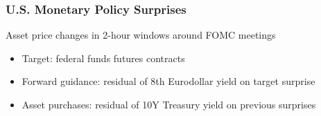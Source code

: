\documentclass[12pt, aspectratio=169, xcolor=dvipsnames]{beamer}
\begin{document}


{%
\begin{frame}
\frametitle{U.S. Monetary Policy Surprises}

Asset price changes in 2-hour windows around FOMC meetings %
	\begin{itemize}
		\item \alert{Target}: federal funds futures contracts
		\item \alert{Forward guidance}: residual of 8th Eurodollar yield on target surprise
		\item \alert{Asset purchases}: residual of 10Y Treasury yield on previous surprises %
	\end{itemize}
\begin{center}

\end{center}
\end{frame}
}
\end{document}
